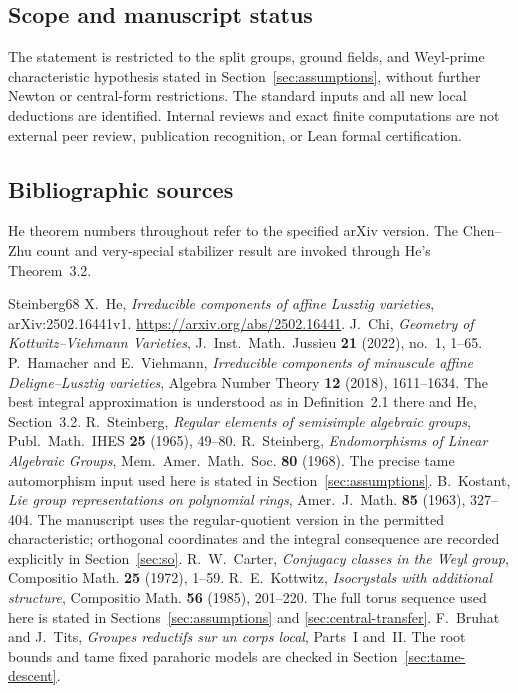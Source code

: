 \documentclass[11pt,a4paper]{article}
\theoremstyle{definition}
\theoremstyle{remark}
\begin{document}
\subsection{Scope and manuscript status}
The statement is restricted to the split groups, ground fields, and
Weyl-prime characteristic hypothesis stated in
Section~\ref{sec:assumptions}, without further Newton or central-form
restrictions.
The standard inputs and all new local deductions are identified.
Internal reviews and exact finite computations are not external
peer review, publication recognition, or Lean formal certification.

\subsection{Bibliographic sources}
He theorem numbers throughout refer to the specified arXiv version.
The Chen--Zhu count and very-special stabilizer result are invoked
through He's Theorem~3.2.

\begin{thebibliography}{Steinberg68}
X.~He, \emph{Irreducible components of affine Lusztig varieties},
arXiv:2502.16441v1.
\url{https://arxiv.org/abs/2502.16441}.
J.~Chi, \emph{Geometry of Kottwitz--Viehmann Varieties},
J.~Inst.~Math.~Jussieu \textbf{21} (2022), no.~1, 1--65.
P.~Hamacher and E.~Viehmann,
\emph{Irreducible components of minuscule affine Deligne--Lusztig
varieties}, Algebra Number Theory \textbf{12} (2018), 1611--1634.
The best integral approximation is understood as in Definition~2.1
there and He, Section~3.2.
R.~Steinberg, \emph{Regular elements of semisimple algebraic groups},
Publ.~Math.~IHES \textbf{25} (1965), 49--80.
R.~Steinberg, \emph{Endomorphisms of Linear Algebraic Groups},
Mem.~Amer.~Math.~Soc. \textbf{80} (1968).
The precise tame automorphism input used here is stated in
Section~\ref{sec:assumptions}.
B.~Kostant, \emph{Lie group representations on polynomial rings},
Amer.~J.~Math. \textbf{85} (1963), 327--404.
The manuscript uses the regular-quotient version in the permitted
characteristic; orthogonal coordinates and the integral consequence
are recorded explicitly in Section~\ref{sec:so}.
R.~W.~Carter, \emph{Conjugacy classes in the Weyl group},
Compositio Math. \textbf{25} (1972), 1--59.
R.~E.~Kottwitz, \emph{Isocrystals with additional structure},
Compositio Math. \textbf{56} (1985), 201--220.
The full torus sequence used here is stated in
Sections~\ref{sec:assumptions} and \ref{sec:central-transfer}.
F.~Bruhat and J.~Tits, \emph{Groupes reductifs sur un corps local},
Parts~I and~II.
The root bounds and tame fixed parahoric models are checked in
Section~\ref{sec:tame-descent}.
\end{thebibliography}
\end{document}
